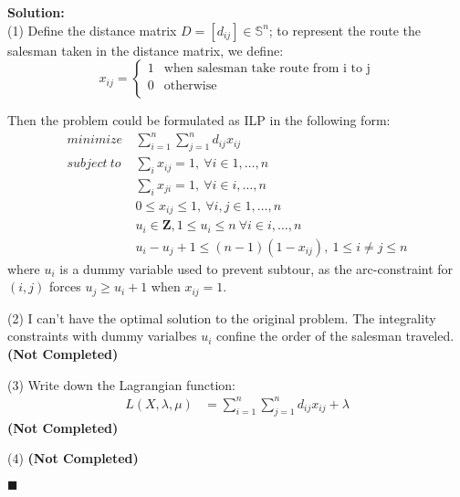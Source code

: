\documentclass{article}
\newenvironment{solution}                               %
{\textbf{Solution:} \\}{$\blacksquare$\newline}         %
\newcommand{\domS}{\mathbb{S}}                          %
\begin{document}
\begin{solution}
    (1) Define the distance matrix $D = [d_{ij}] \in \domS^n$; to represent the route the salesman taken in the distance matrix, we define:
    \[
        x_{ij} = 
        \begin{cases}
            1 & \text{when salesman take route from i to j} \\
            0 & \text{otherwise} \\
        \end{cases}
    \]

    Then the problem could be formulated as ILP in the following form:
    \begin{align*}
        minimize\ & \sum_{i=1}^n\sum_{j=1}^n d_{ij} x_{ij} \\
        subject\ to\ 
        & \sum_i x_{ij} = 1,\ \forall i \in {1, \dots, n} \\
        & \sum_i x_{ji} = 1,\ \forall i \in {i, \dots,n} \\
        & 0 \leq x_{ij} \leq 1,\ \forall i,j \in {1, \dots, n} \\
        & u_i \in \textbf{Z},
          1 \leq u_i \leq n\ \forall i \in {i, \dots,n} \\
        & u_i - u_j + 1 \leq (n - 1)(1 - x_{ij}),\ 1 \leq i \neq j \leq n
    \end{align*}
    where $u_i$ is a dummy variable used to prevent subtour, as the arc-constraint for $(i,j)$ forces $u_j \geq u_i + 1$ when $x_{ij} = 1$.

    (2) I can't have the optimal solution to the original problem. The integrality constraints with dummy varialbes $u_i$ confine the order of the salesman traveled.
    \textbf{(Not Completed)}

    (3) Write down the Lagrangian function:
    \begin{align*}
        L(X, \lambda, \mu) &= \sum_{i=1}^n\sum_{j=1}^n{ d_{ij}x_{ij} } + 
                            \lambda 
    \end{align*}
    \textbf{(Not Completed)}

    (4) \textbf{(Not Completed)}

\end{solution}
\end{document}

